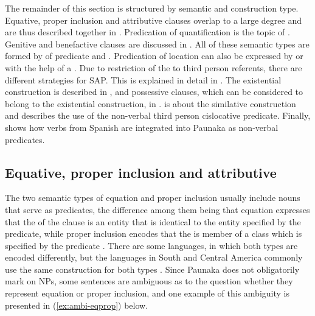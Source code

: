 The remainder of this section is structured by semantic and construction type. Equative, proper inclusion and attributive clauses overlap to a large degree and are thus described together in . Predication of quantification is the topic of . Genitive and benefactive clauses are discussed in . All of these semantic types are formed by  of predicate and . Predication of location can also be expressed by  or with the help of a . Due to restriction of the  to third person referents, there are different strategies for SAP. This is explained in detail in . The existential construction is described in , and possessive clauses, which can be considered to belong to the existential construction, in .  is about the similative construction and  describes the use of the non-verbal third person cislocative predicate. Finally,  shows how verbs from Spanish are integrated into Paunaka as non-verbal predicates.



\subsection{Equative, proper inclusion and attributive}\label{sec:PropInclEquatAttr}

The two semantic types of equation and proper inclusion usually include nouns that serve as predicates, the difference among them being that equation expresses that the  of the clause is an entity that is identical to the entity specified by the predicate, while proper inclusion encodes that the  is member of a class which is specified by the predicate \citep[114]{Payne1997}. There are some languages, in which both types are encoded differently, but the languages in South and Central America commonly use the same construction for both types \citep[7]{Overall2018}. Since Paunaka does not obligatorily mark  on NPs, some sentences are ambiguous as to the question whether they represent equation or proper inclusion, and one example of this ambiguity is presented in (\ref{ex:ambi-eqprop}) below.

